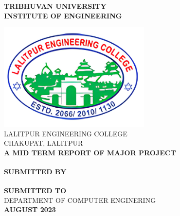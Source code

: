 \begin{center}

    \thispagestyle{empty}
    {\fontsize{16 pt}{12} \selectfont\textbf{TRIBHUVAN UNIVERSITY} \\
        \textbf{INSTITUTE OF ENGINEERING}} \\
    \vspace{0.3 in}

    \includegraphics[width= 3in ]{img/leclogo21.png} \\
    \vspace{0.05 in}
    LALITPUR ENGINEERING COLLEGE \\
    CHAKUPAT, LALITPUR \\

    \vspace{0.5 in}
    \textbf{ A MID TERM REPORT OF MAJOR PROJECT}\\
    {\fontsize{16 pt}{12} \selectfont \textbf{\thetitle}}\\
    \vspace{1.1 in}
    \textbf{ SUBMITTED BY}  \\
    {\theauthor} \\
    \vspace{1.1 in}
    \textbf{ SUBMITTED TO}  \\
    DEPARTMENT OF COMPUTER ENGINERING \\
    \vspace{1 in}
    \textbf{AUGUST 2023} \\
\end{center}